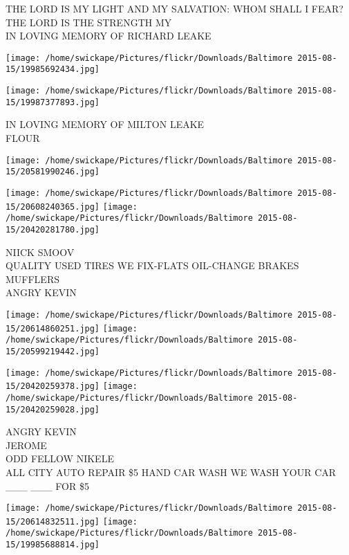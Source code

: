 \documentclass[10pt,letterpaper]{article}
\begin{document}
THE LORD IS MY LIGHT AND MY SALVATION: WHOM SHALL I FEAR?  THE LORD IS THE STRENGTH MY\\
IN LOVING MEMORY OF RICHARD LEAKE\\
\pagebreak

\texttt{[image: /home/swickape/Pictures/flickr/Downloads/Baltimore 2015-08-15/19985692434.jpg]}

\vspace{0.25in}
\texttt{[image: /home/swickape/Pictures/flickr/Downloads/Baltimore 2015-08-15/19987377893.jpg]}

IN LOVING MEMORY OF MILTON LEAKE\\
FLOUR\\
\pagebreak

\texttt{[image: /home/swickape/Pictures/flickr/Downloads/Baltimore 2015-08-15/20581990246.jpg]}

\vspace{0.25in}
\texttt{[image: /home/swickape/Pictures/flickr/Downloads/Baltimore 2015-08-15/20608240365.jpg]}
\texttt{[image: /home/swickape/Pictures/flickr/Downloads/Baltimore 2015-08-15/20420281780.jpg]}

NIICK SMOOV\\
QUALITY USED TIRES WE FIX{-}FLATS OIL{-}CHANGE BRAKES MUFFLERS\\
ANGRY KEVIN\\
\pagebreak

\texttt{[image: /home/swickape/Pictures/flickr/Downloads/Baltimore 2015-08-15/20614860251.jpg]}
\texttt{[image: /home/swickape/Pictures/flickr/Downloads/Baltimore 2015-08-15/20599219442.jpg]}

\texttt{[image: /home/swickape/Pictures/flickr/Downloads/Baltimore 2015-08-15/20420259378.jpg]}
\texttt{[image: /home/swickape/Pictures/flickr/Downloads/Baltimore 2015-08-15/20420259028.jpg]}

ANGRY KEVIN\\
JEROME\\
ODD FELLOW NIKELE\\
ALL CITY AUTO REPAIR \$5 HAND CAR WASH WE WASH YOUR CAR \_\_\_ \_\_\_ FOR \$5\\
\pagebreak

\texttt{[image: /home/swickape/Pictures/flickr/Downloads/Baltimore 2015-08-15/20614832511.jpg]}
\texttt{[image: /home/swickape/Pictures/flickr/Downloads/Baltimore 2015-08-15/19985688814.jpg]}
\end{document}
